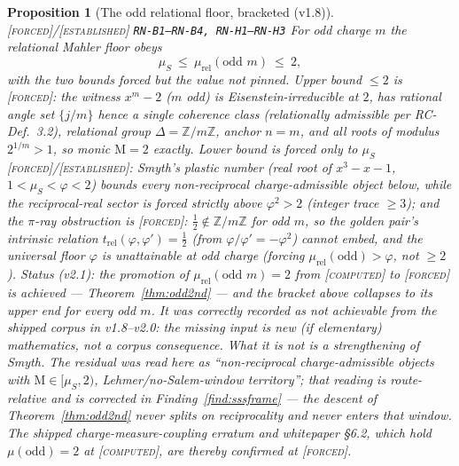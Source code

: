 \documentclass[11pt]{article}
\newcommand{\tagF}{\textcolor{cF}{\textsc{[forced]}}}
\newcommand{\tagC}{\textcolor{cC}{\textsc{[computed]}}}
\newcommand{\tagE}{\textcolor{cE}{\textsc{[established]}}}
\newcommand{\hx}[1]{\textcolor{cC}{\footnotesize\texttt{#1}}}
\newcommand{\Z}{\mathbb{Z}}
\newcommand{\gp}{\varphi}
\newcommand{\M}{\mathrm{M}}
\theoremstyle{plain}
\newtheorem{proposition}[theorem]{Proposition}
\theoremstyle{definition}
\theoremstyle{remark}
\begin{document}
\begin{proposition}[The odd relational floor, bracketed (v1.8)]\label{prop:oddfloor}\tagF{}/\tagE{} \hx{RN-B1--RN-B4, RN-H1--RN-H3}
For odd charge $m$ the relational Mahler floor obeys
\[
\mu_S\ \le\ \mu_{\mathrm{rel}}(\text{odd }m)\ \le\ 2,
\]
with the two bounds forced but the value \emph{not} pinned. \emph{Upper bound}
$\le2$ is \tagF{}: the witness $x^m-2$ ($m$ odd) is Eisenstein-irreducible at
$2$, has rational angle set $\{j/m\}$ hence a single coherence class
(relationally admissible per RC-Def.~3.2), relational group $\Delta=\Z/m\Z$,
anchor $n=m$, and all roots of modulus $2^{1/m}>1$, so monic $\M=2$ exactly.
\emph{Lower bound} is forced only to $\mu_S$ \tagF{}/\tagE{}: Smyth's plastic
number (real root of $x^3-x-1$, $1<\mu_S<\gp<2$) bounds every non-reciprocal
charge-admissible object below, while the reciprocal-real sector is forced
strictly above $\gp^2>2$ (integer trace $\ge3$); and the $\pi$-ray obstruction
is \tagF{}: $\tfrac12\notin\Z/m\Z$ for odd $m$, so the golden pair's intrinsic
relation $t_{\mathrm{rel}}(\gp,\gp')=\tfrac12$ (from $\gp/\gp'=-\gp^2$) cannot
embed, and the universal floor $\gp$ is unattainable at odd charge (forcing
$\mu_{\mathrm{rel}}(\text{odd})>\gp$, not $\ge2$). \emph{Status (v2.1):} the
promotion of $\mu_{\mathrm{rel}}(\text{odd }m)=2$ from \tagC{} to \tagF{} is
\emph{achieved} --- Theorem~\ref{thm:odd2nd} --- and the bracket above collapses
to its upper end for every odd $m$. It was correctly recorded as not achievable
from the \emph{shipped} corpus in v1.8--v2.0: the missing input is new (if
elementary) mathematics, not a corpus consequence. What it is \emph{not} is a
strengthening of Smyth. The residual was read here as ``non-reciprocal
charge-admissible objects with $\M\in[\mu_S,2)$, Lehmer/no-Salem-window
territory''; that reading is route-relative and is corrected in
Finding~\ref{find:sssframe} --- the descent of Theorem~\ref{thm:odd2nd} never
splits on reciprocality and never enters that window. The shipped
charge-measure-coupling erratum and whitepaper \S6.2, which hold
$\mu(\text{odd})=2$ at \tagC{}, are thereby confirmed at \tagF{}.
\end{proposition}
\end{document}
